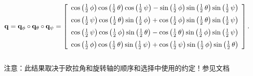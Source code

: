 $$ \mathbf{q} = \mathbf{q_{\phi}} \circ \mathbf{q_{\theta}} \circ \mathbf{q_{\psi}} =  \left[ \begin {array}{c} \cos \left( \frac{1}{2}\,{\it \phi} \right) \cos \left( \frac{1}{2}\,{\it \theta} \right) \cos \left( \frac{1}{2}\,{\it \psi} \right) -\sin \left( \frac{1}{2}\,{\it \phi} \right) \sin \left( \frac{1}{2}\,{\it \theta} \right) \sin \left( \frac{1}{2}\,{\it \psi} \right) \\\noalign{\medskip}\cos \left( \frac{1}{2}\,{\it \psi} \right) \cos \left( \frac{1}{2}\,{\it \theta} \right) \sin \left( \frac{1}{2}\,{\it \phi} \right) +\cos \left( \frac{1}{2}\,{\it \phi} \right) \sin \left( \frac{1}{2}\,{\it \theta} \right) \sin \left( \frac{1}{2}\,{\it \psi} \right) \\\noalign{\medskip}\cos \left( \frac{1}{2}\,{\it \psi} \right) \cos \left( \frac{1}{2}\,{\it \phi} \right) \sin \left( \frac{1}{2}\,{\it \theta} \right) -\cos \left( \frac{1}{2}\,{\it \theta} \right) \sin \left( \frac{1}{2}\,{\it \phi} \right) \sin \left( \frac{1}{2}\,{\it \psi} \right) \\\noalign{\medskip}\cos \left( \frac{1}{2}\,{\it \phi} \right) \cos \left( \frac{1}{2}\,{\it \theta} \right) \sin \left( \frac{1}{2}\,{\it \psi} \right) +\cos \left( \frac{1}{2}\,{\it \psi} \right) \sin \left( \frac{1}{2}\,{\it \phi} \right) \sin \left( \frac{1}{2}\,{\it \theta} \right) \end {array} \right]. $$ \\ 




注意：此结果取决于欧拉角和旋转轴的顺序和选择中使用的约定！参见文档\cite{mathworksQuat}


%  
